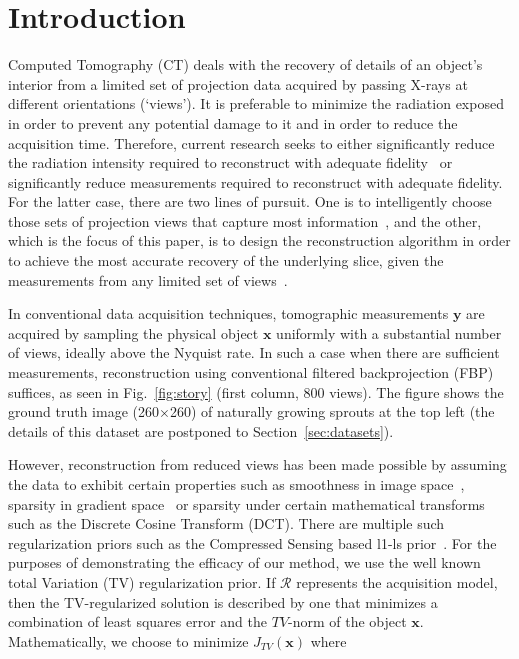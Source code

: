 \documentclass[journal]{IEEEtran}
\begin{document}
\section{Introduction}
\label{sec:intro}
Computed Tomography (CT) deals with the recovery of details of an
object's interior from a limited set of projection data acquired by
passing X-rays at different orientations (`views'). It is preferable
to minimize the radiation exposed in order to prevent any potential
damage to it and in order to reduce the acquisition time. Therefore,
current research seeks to either significantly reduce the radiation
intensity required to reconstruct with adequate
fidelity~\cite{yang2018,Lin2016,Xie2017,gopal2019low} or significantly
reduce measurements required to reconstruct with
adequate fidelity. For the latter case, there are two lines of
pursuit. One is to intelligently choose those sets of projection views
that capture most
information~\cite{King2018,Anthony2018,barkan17,fischer16,andrei14},
and the other, which is the focus of this paper, is to design the
reconstruction algorithm in order to achieve the most accurate
recovery of the underlying slice, given the measurements from any
limited set of views~\cite{yang2018,geyer2015,kilic2011}.

In conventional data acquisition techniques, tomographic measurements
$\boldsymbol{y}$ are acquired by sampling the physical object
$\boldsymbol{x}$ uniformly with a substantial number of views, ideally
above the Nyquist rate. In such a case when there are sufficient
measurements, reconstruction using conventional filtered
backprojection (FBP) suffices, as seen in Fig.~\ref{fig:story} (first
column, 800 views). The figure shows the ground truth image
(260$\times$260) of naturally growing sprouts at the top left (the
details of this dataset are postponed to Section~\ref{sec:datasets}).

However, reconstruction from reduced views has been made possible by
assuming the data to exhibit certain properties such as smoothness in
image space~\cite{Essam2015}, sparsity in gradient space~\cite{TV} or sparsity under
certain mathematical transforms~\cite{Donoho,introCS} such as the
Discrete Cosine Transform (DCT).  There are multiple such
regularization priors such as the Compressed
Sensing based l1-ls prior~\cite{my_dicta_paper}. For the purposes of
demonstrating the efficacy of our method, we use the well known total Variation (TV)
regularization prior.
If $\boldsymbol{\mathcal{R}}$ represents the acquisition
model, then the TV-regularized solution is described by one that
minimizes a combination of least squares error and the $TV$-norm of
the object $\boldsymbol{x}$. Mathematically, we choose to minimize
$J_{TV}(\boldsymbol{x})$ where
\end{document}
